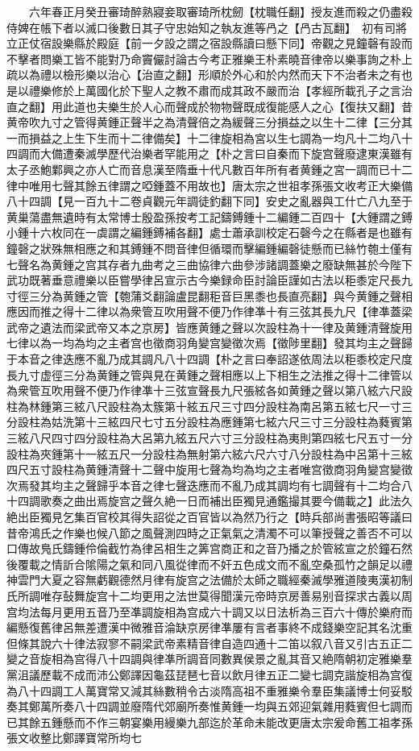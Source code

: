 　　六年春正月癸丑審琦醉熟寢妾取審琦所枕劒【枕職任翻】授友進而殺之仍盡殺侍婢在帳下者以滅口後數日其子守忠始知之執友進等冎之【冎古瓦翻】　初有司將立正仗宿設樂縣於殿庭【前一夕設之謂之宿設縣讀曰懸下同】帝觀之見鐘磬有設而不擊者問樂工皆不能對乃命竇儼討論古今考正雅樂王朴素曉音律帝以樂事詢之朴上疏以為禮以檢形樂以治心【治直之翻】形順於外心和於内然而天下不治者未之有也是以禮樂修於上萬國化於下聖人之教不肅而成其政不嚴而治【孝經所載孔子之言治直之翻】用此道也夫樂生於人心而聲成於物物聲既成復能感人之心【復扶又翻】昔黄帝吹九寸之管得黄鍾正聲半之為清聲倍之為緩聲三分損益之以生十二律【三分其一而損益之上生下生而十二律備矣】十二律旋相為宮以生七調為一均凡十二均八十四調而大備遭秦滅學歷代治樂者罕能用之【朴之言曰自秦而下旋宫聲廢逮東漢雖有太子丞鮑鄴興之亦人亡而音息漢至隋垂十代凡數百年所有者黄鍾之宮一調而已十二律中唯用七聲其餘五律謂之啞鍾蓋不用故也】唐太宗之世祖孝孫張文收考正大樂備八十四調【見一百九十二卷貞觀元年調徒釣翻下同】安史之亂器與工什亡八九至于黄巢蕩盡無遺時有太常博士殷盈孫按考工記鑄鎛鍾十二編鍾二百四十【大鍾謂之鎛小鍾十六枚同在一虡謂之編鍾鎛補各翻】處士蕭承訓校定石磬今之在縣者是也雖有鐘磬之狀殊無相應之和其鎛鍾不問音律但循環而擊編鍾編磬徒懸而已絲竹匏土僅有七聲名為黄鍾之宫其存者九曲考之三曲協律六曲參涉諸調蓋樂之廢缺無甚於今陛下武功既著垂意禮樂以臣嘗學律呂宣示古今樂録命臣討論臣謹如古法以秬黍定尺長九寸徑三分為黄鍾之管【匏蒲爻翻論盧昆翻秬音巨黑黍也長直亮翻】與今黄鍾之聲相應因而推之得十二律以為衆管互吹用聲不便乃作律凖十有三弦其長九尺【律凖蓋梁武帝之遺法而梁武帝又本之京房】皆應黄鍾之聲以次設柱為十一律及黄鍾清聲旋用七律以為一均為均之主者宫也徵商羽角變宫變徵次焉【徵陟里翻】發其均主之聲歸于本音之律迭應不亂乃成其調凡八十四調【朴之言曰奉詔遂依周法以秬黍校定尺度長九寸虚徑三分為黄鍾之管與見在黄鍾之聲相應以上下相生之法推之得十二律管以為衆管互吹用聲不便乃作律凖十三弦宣聲長九尺張絃各如黄鍾之聲以第八絃六尺設柱為林鍾第三絃八尺設柱為太簇第十絃五尺三寸四分設柱為南呂第五絃七尺一寸三分設柱為姑洗第十三絃四尺七寸五分設柱為應鍾第七絃六尺三寸三分設柱為蕤賓第三絃八尺四寸四分設柱為大呂第九絃五尺六寸三分設柱為夷則第四絃七尺五寸一分設柱為夾鍾第十一絃五尺一分設柱為無射第六絃六尺六寸八分設柱為中呂第十三絃四尺五寸設柱為黄鍾清聲十二聲中旋用七聲為均為均之主者唯宫徵商羽角變宫變徵次焉發其均主之聲歸乎本音之律七聲迭應而不亂乃成其調均有七調聲有十二均合八十四調歌奏之曲出焉旋宫之聲久絶一日而補出臣獨見通鑑撮其要今備載之】此法久絶出臣獨見乞集百官校其得失詔從之百官皆以為然乃行之【時兵部尚書張昭等議曰昔帝鴻氏之作樂也候八節之風聲測四時之正氣氣之清濁不可以筆授聲之善否不可以口傳故鳬氏鑄鍾伶倫截竹為律呂相生之筭宫商正和之音乃播之於管絃宣之於鐘石然後覆載之情訢合隂陽之氣和同八風從律而不奸五色成文而不亂空桑孤竹之韻足以禮神雲門大夏之容無虧觀德然月律有旋宫之法備於太師之職經秦滅學雅道陵夷漢初制氏所調唯存鼔舞旋宫十二均更用之法世莫得聞漢元帝時京房善易别音探求古義以周宫均法每月更用五音乃至凖調旋相為宫成六十調又以日法析為三百六十傳於樂府而編懸復舊律呂無差遭漢中微雅音淪缺京房律凖屢有言者事終不成錢樂空記其名沈重但條其說六十律法寂寥不嗣梁武帝素精音律自造四通十二笛以叙八音又引古五正二變之音旋相為宫得八十四調與律凖所調音同數異侯景之亂其音又絶隋朝初定雅樂羣黨沮議歷載不成而沛公鄭譯因龜茲琵琶七音以飲月律五正二變七調克諧旋相為宫復為八十四調工人萬寶常又減其絲數稍令古淡隋高祖不重雅樂令羣臣集議博士何妥駁奏其鄭萬所奏八十四調並廢隋代郊廟所奏惟黄鍾一均與五郊迎氣雜用蕤賓但七調而已其餘五鍾懸而不作三朝宴樂用縵樂九部迄於革命未能改更唐太宗爰命舊工祖孝孫張文收整比鄭譯寶常所均七
